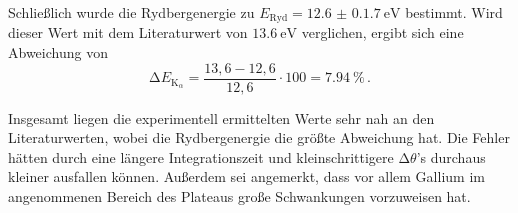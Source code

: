 Schließlich wurde die Rydbergenergie zu $E_\text{Ryd} = \qty{12.6(0.17)}{\eV}$ bestimmt.
Wird dieser Wert mit dem Literaturwert von $\qty{13.6}{\eV}$ verglichen, ergibt sich eine Abweichung von
\begin{equation}
    \increment E_{\text{K}_\alpha} = \frac{13,6 - 12,6}{12,6} \cdot 100 = \qty{7.94}{\%} \, .
\end{equation}

Insgesamt liegen die experimentell ermittelten Werte sehr nah an den Literaturwerten, wobei die Rydbergenergie die größte Abweichung hat.
Die Fehler hätten durch eine längere Integrationszeit und kleinschrittigere $\increment \theta$'s durchaus kleiner ausfallen können.
Außerdem sei angemerkt, dass vor allem Gallium im angenommenen Bereich des Plateaus große Schwankungen vorzuweisen hat.